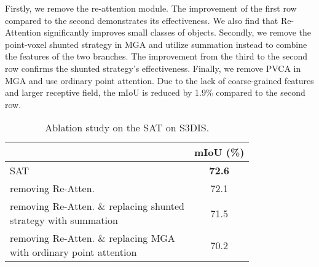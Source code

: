 \documentclass[10pt,twocolumn,letterpaper]{article}
\begin{document}
Firstly, we remove the re-attention module. The improvement of the first row compared to the second demonstrates its effectiveness. We also find that Re-Attention significantly improves small classes of objects. Secondly, we remove the point-voxel shunted strategy in MGA and utilize summation instead to combine the features of the two branches. The improvement from the third to the second row confirms the shunted strategy's effectiveness. Finally, we remove PVCA in MGA and use ordinary point attention. Due to the lack of coarse-grained features and larger receptive field, the mIoU is reduced by 1.9\% compared to the second row.







































\begin{table}
\begin{center}
\begin{tabular}{l|c}
\toprule
                         & mIoU (\%)            \\
\midrule
SAT         &   \textbf{72.6}        \\

removing Re-Atten. &   72.1          \\
\makecell[l]{removing Re-Atten. \& replacing shunted\\ strategy with summation}  &           71.5     \\
\makecell[l]{removing Re-Atten. \& replacing MGA\\  with ordinary point attention}  &       70.2         \\
\bottomrule
\end{tabular}
\end{center}
\caption{Ablation study on the SAT on S3DIS. }
\label{tbl-ablation}
\end{table}
\end{document}
